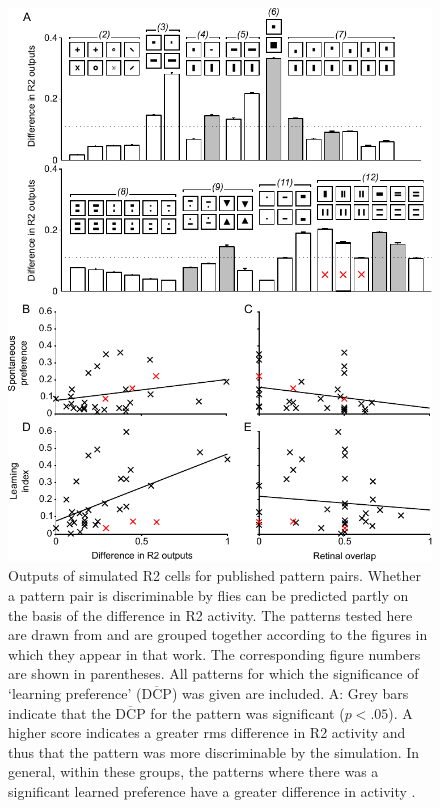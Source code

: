 \begin{figure}[htp]
\centering
\vspace{-2cm}
\includegraphics{figures/pattern}
\caption{Outputs of simulated R2 cells for published pattern pairs.
Whether a pattern pair is discriminable by flies can be predicted partly on the basis of the difference in R2 activity.
The patterns tested here are drawn from \protect\cite{Ernst1999} and are grouped together according to the figures in which they appear in that work.
The corresponding figure numbers are shown in parentheses.
All patterns for which the significance of `learning preference' ($\overline{\mathrm{DCP}}$) was given are included.
A: Grey bars indicate that the $\overline{\mathrm{DCP}}$ for the pattern was significant ($p<.05$).
A higher score indicates a greater \ac{rms} difference in R2 activity and thus that the pattern was more discriminable by the simulation.
In general, within these groups, the patterns where there was a significant learned preference have a greater difference in activity \protect\cite{Ernst1999}.
}
\end{figure}
